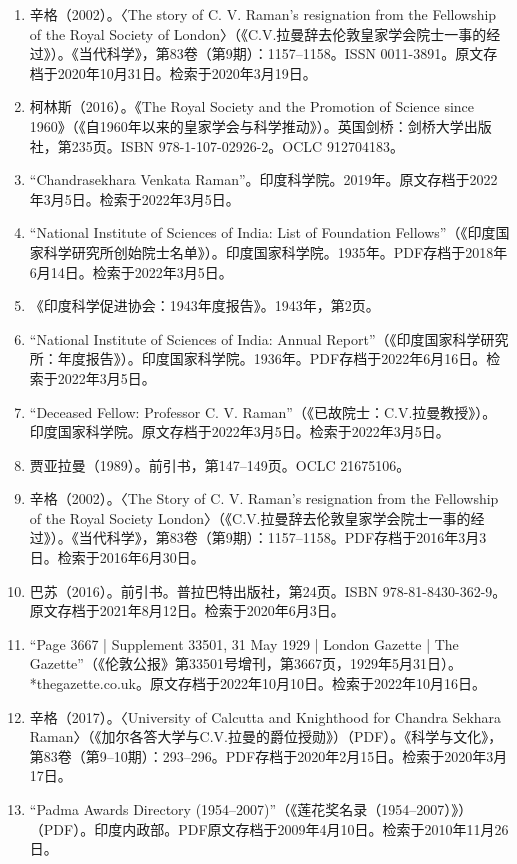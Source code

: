\begin{enumerate}
\item 辛格（2002）。〈The story of C. V. Raman's resignation from the Fellowship of the Royal Society of London〉（《C.V.拉曼辞去伦敦皇家学会院士一事的经过》）。《当代科学》，第83卷（第9期）：1157–1158。ISSN 0011-3891。原文存档于2020年10月31日。检索于2020年3月19日。
\item 柯林斯（2016）。《The Royal Society and the Promotion of Science since 1960》（《自1960年以来的皇家学会与科学推动》）。英国剑桥：剑桥大学出版社，第235页。ISBN 978-1-107-02926-2。OCLC 912704183。
\item “Chandrasekhara Venkata Raman”。印度科学院。2019年。原文存档于2022年3月5日。检索于2022年3月5日。
\item “National Institute of Sciences of India: List of Foundation Fellows”（《印度国家科学研究所创始院士名单》）。印度国家科学院。1935年。PDF存档于2018年6月14日。检索于2022年3月5日。
\item 《印度科学促进协会：1943年度报告》。1943年，第2页。
\item “National Institute of Sciences of India: Annual Report”（《印度国家科学研究所：年度报告》）。印度国家科学院。1936年。PDF存档于2022年6月16日。检索于2022年3月5日。
\item “Deceased Fellow: Professor C. V. Raman”（《已故院士：C.V.拉曼教授》）。印度国家科学院。原文存档于2022年3月5日。检索于2022年3月5日。
\item 贾亚拉曼（1989）。前引书，第147–149页。OCLC 21675106。
\item 辛格（2002）。〈The Story of C. V. Raman's resignation from the Fellowship of the Royal Society London〉（《C.V.拉曼辞去伦敦皇家学会院士一事的经过》）。《当代科学》，第83卷（第9期）：1157–1158。PDF存档于2016年3月3日。检索于2016年6月30日。
\item 巴苏（2016）。前引书。普拉巴特出版社，第24页。ISBN 978-81-8430-362-9。原文存档于2021年8月12日。检索于2020年6月3日。
\item “Page 3667 | Supplement 33501, 31 May 1929 | London Gazette | The Gazette”（《伦敦公报》第33501号增刊，第3667页，1929年5月31日）。*thegazette.co.uk。原文存档于2022年10月10日。检索于2022年10月16日。
\item 辛格（2017）。〈University of Calcutta and Knighthood for Chandra Sekhara Raman〉（《加尔各答大学与C.V.拉曼的爵位授勋》）（PDF）。《科学与文化》，第83卷（第9–10期）：293–296。PDF存档于2020年2月15日。检索于2020年3月17日。
\item “Padma Awards Directory (1954–2007)”（《莲花奖名录（1954–2007）》）（PDF）。印度内政部。PDF原文存档于2009年4月10日。检索于2010年11月26日。

\end{enumerate}
